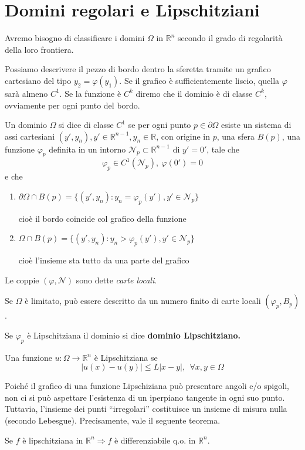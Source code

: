 \documentclass[10pt,a4paper,twoside,openright]{book}
\begin{document}
\section{Domini regolari e Lipschitziani}

Avremo bisogno di classificare i domini $\Omega $ in $\mathbb{R}^{n}$ secondo il grado di regolarità della loro frontiera.

Possiamo descrivere il pezzo di bordo dentro la sferetta tramite un grafico cartesiano del tipo $y_{2} =\varphi (y_{1})$. Se il grafico è sufficientemente liscio, quella $\varphi $ sarà almeno $C^{1}$. Se la funzione è $C^{k}$ diremo che il dominio è di classe $C^{k}$, ovviamente per ogni punto del bordo.


\begin{definition}
	Un dominio $\Omega $ si dice di classe $C^{1}$ se per ogni punto $p\in \partial \Omega $ esiste un sistema di assi cartesiani $(y',y_{n}),y'\in \mathbb{R}^{n-1},y_{n} \in \mathbb{R}$, con origine in $p$, una sfera $B(p)$, una funzione $\varphi _{p}$ definita in un intorno $\mathcal{N}_{p} \subset \mathbb{R}^{n-1}$ di $y'=0'$, tale che
	\begin{equation*}
	\varphi _{p} \in C^{1}(\mathcal{N}_{p}),\ \varphi (0') =0
	\end{equation*}
	e che
	\begin{enumerate}
	\item $\partial \Omega \cap B(p) =\{(y',y_{n}) :y_{n} =\varphi _{p}(y'),y'\in \mathcal{N}_{p}\}$

	cioè il bordo coincide col grafico della funzione
	\item $\Omega \cap B(p) =\{(y',y_{n}) :y_{n}  >\varphi _{p}(y'),y'\in \mathcal{N}_{p}\}$

	cioè l'insieme sta tutto da una parte del grafico
	\end{enumerate}
\end{definition}

Le coppie $( \varphi,\mathcal{N})$ sono dette \textit{carte locali}.

Se $\Omega $ è limitato, può essere descritto da un numero finito di carte locali $( \varphi _{p},B_{p})$.

Se $\varphi _{p}$ è Lipschitziana il dominio si dice \textbf{dominio Lipschitziano.}
\begin{definition}
 Una funzione $u:\Omega \rightarrow \mathbb{R}^{n}$ è Lipschitziana se
\begin{equation*}
| u(x) -u(y)| \leqslant L| x-y|,\ \ \forall x,y\in \Omega 
\end{equation*}
\end{definition}
Poiché il grafico di una funzione Lipschiziana può presentare angoli e/o spigoli, non ci si può aspettare l’esistenza di un iperpiano tangente in ogni suo punto. Tuttavia, l’insieme dei punti ``irregolari'' costituisce un insieme di misura nulla (secondo Lebesgue). Precisamente, vale il seguente teorema.
\begin{theorem}
[di Rademacher] Se $f$ è lipschitziana in $\mathbb{R}^{n} \Rightarrow f$ è differenziabile q.o. in $\mathbb{R}^{n}$.
\end{theorem}
\end{document}
